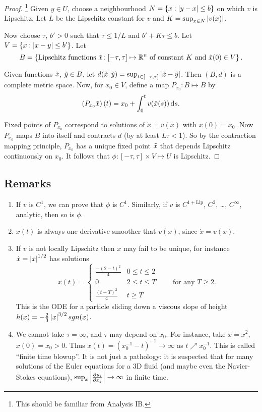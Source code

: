 \documentclass{notes}
\theoremstyle{plain}
\begin{document}
\begin{proof}\footnote{This should be familiar from Analysis IB.}
  Given $y \in U$, choose a neighbourhood $N = \{ x : \left|y-x\right| \le b
  \}$ on which $v$ is Lipschitz.  Let $L$ be the Lipschitz constant
  for $v$ and $K = \sup_{x \in N} \left|v(x)\right|$.
  
  Now choose $\tau$, $b' > 0$ such that $\tau \le 1/L$ and $b' + K
  \tau \le b$.  Let $V = \{ x : \left|x-y\right| \le b'\}$.  Let
\[
B = \left\{ \text{Lipschitz functions $\Tilde{x} \colon [ -\tau, \tau ]
    \mapsto \mathbb{R}^n$ of constant $K$ and } \Tilde{x}(0) \in V \right\}.
\]

Given functions $\Tilde{x}$, $\Tilde{y} \in B$, let $d(\Tilde{x},
\Tilde{y}) = \sup_{t \in [ -\tau, \tau ]} \left|\Tilde{x} -
  \Tilde{y}\right|$.  Then $(B,d)$ is a complete metric space.  Now, for
$x_0 \in V$, define a map $P_{x_0} \colon B \mapsto B$ by
\[
\left(P_{x_0} \Tilde{x}\right) (t) = x_0 + \int_0^t v(\Tilde{x}(s))
\,\mathrm{d} s.
\]

Fixed points of $P_{x_0}$ correspond to solutions of $\dot{x} = v(x)$
with $x(0) = x_0$.  Now $P_{x_0}$ maps $B$ into itself and contracts
$d$ (by at least $L \tau < 1$).  So by the contraction mapping
principle, $P_{x_0}$ has a unique fixed point $\Tilde{x}$ that depends
Lipschitz continuously on $x_0$.  It follows that $\phi \colon [ -\tau,
\tau ] \times V \mapsto U$ is Lipschitz.
\end{proof}

\subsection*{Remarks}

\begin{enumerate}
\item If $v$ is $C^1$, we can prove that $\phi$ is $C^1$.  Similarly,
  if $v$ is $C^{1 + \text{Lip}}$, $C^2$, \dots, $C^{\infty}$,
  analytic, then so is $\phi$.
\item $x(t)$ is always one derivative smoother that $v(x)$, since
  $\dot{x} = v(x)$.
\item If $v$ is not locally Lipschitz then $x$ may fail to be unique,
  for instance $\dot{x} = \left|x\right|^{1/2}$ has solutions
\[
x(t) = \begin{cases}
  \frac{-(2-t)^2}{4} & 0 \le t \le 2 \\
  0 & 2 \le t \le T \\
  \frac{(t-T)^2}{4} & t \ge T
\end{cases} \qquad \text{for any $T \ge 2$.}
\]
This is the ODE for a particle sliding down a viscous slope of height
$h(x) = - \tfrac{2}{3} \left|x\right|^{3/2} sgn(x)$.
\item We cannot take $\tau = \infty$, and $\tau$ may depend on $x_0$.
  For instance, take $\dot{x} = x^2$, $x(0) = x_0 > 0$.  Thus $x(t) =
  \left(x_0^{-1} - t\right)^{-1} \rightarrow \infty$ as $t \nearrow
  x_0^{-1}$.  This is called ``finite time blowup''.  It is not just a
  pathology: it is suspected that for many solutions of the Euler
  equations for a 3D fluid (and maybe even the Navier-Stokes
  equations), $\sup_x \left|\frac{\partial u_i}{\partial x_j}\right| \rightarrow \infty$ in
  finite time.
\end{enumerate}
\end{document}
